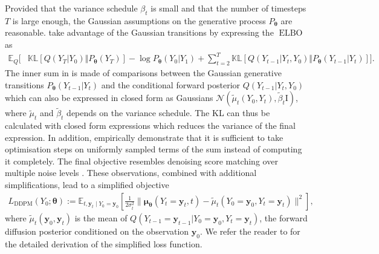 Provided that the variance schedule $\beta_t$ is small and that the number of timesteps $T$ is large enough, the Gaussian assumptions on the generative process $P_{\bm{\theta}}$ are reasonable. \citet{ho_denoising_2020} take advantage of the Gaussian transitions by expressing the $\operatorname{ELBO}$ as
\begin{align}
        \mathbb{E}_Q \biggl[& \mathbb{KL}\left[Q(Y_T|Y_0)\Vert P_{\bm{\theta}}(Y_T)\right] - \log P_{\bm{\theta}}(Y_0|Y_1) + \sum_{t=2}^T \mathbb{KL}\left[Q(Y_{t-1}|Y_t, Y_0)\Vert P_{\bm{\theta}}(Y_{t-1}|Y_t)\right]
     \biggr]. \label{eq:simple_DDPM_ELBO}
\end{align}
The inner sum in  is made of comparisons between the Gaussian generative transitions $P_{\bm{\theta}}(Y_{t-1}|Y_t)$ and the conditional forward posterior $Q(Y_{t-1}|Y_t, Y_0)$ which can also be expressed in closed form as Gaussians $\mathcal{N}(\tilde{\mu}_t(Y_0, Y_t), \tilde{\beta}_t \text{I})$, where $\tilde{\mu}_t$ and $\tilde{\beta}_t$ depends on the variance schedule. The KL can thus be calculated with closed form expressions which reduces the variance of the final expression.
In addition, \citet{ho_denoising_2020} empirically demonstrate that it is sufficient to take optimisation steps on uniformly sampled terms of the sum instead of computing it completely. The final objective resembles denoising score matching over multiple noise levels \citep{vincent2011connection}. These observations, combined with additional simplifications, lead to a simplified objective
\begin{align}
    L_\text{DDPM}(Y_0; \bm{\theta}) := \mathbb{E}_{t, \mathbf{y}_t \mid Y_0 = \mathbf{y}_0}\left[ \frac{1}{2\sigma^2_t}\lVert \mathbf{\mu}_{\bm{\theta}}(Y_t=\mathbf{y}_t, t) - \tilde{\mu}_t(Y_0=\mathbf{y}_0, Y_t=\mathbf{y}_t)  \rVert^2\right],
\end{align}
where $\tilde{\mu}_t(\mathbf{y}_0, \mathbf{y}_t)$ is the mean of $Q(Y_{t-1} = \mathbf{y}_{t-1}|Y_0 = \mathbf{y}_{0}, Y_t = \mathbf{y}_{t})$, the forward diffusion posterior conditioned on the observation $\mathbf{y}_{0}$. We refer the reader to \citet{ho_denoising_2020} for the detailed derivation of the simplified loss function.

